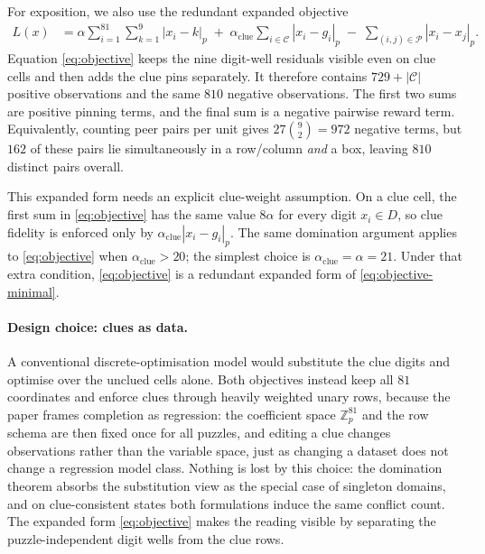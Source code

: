 \documentclass[11pt]{article}
\begin{document}
For exposition, we also use the redundant expanded objective
\begin{align}
L(x) &=
\alpha\sum_{i=1}^{81}\sum_{k=1}^9 |x_i - k|_p
\;+\;
\alpha_{\mathrm{clue}}\sum_{i\in\mathcal{C}} |x_i - g_i|_p
\;-\;
\sum_{(i,j)\in\mathcal{P}} |x_i-x_j|_p.
\label{eq:objective}
\end{align}
Equation \eqref{eq:objective} keeps the nine digit-well residuals visible even on clue cells and then adds the clue pins separately. It therefore contains \(729+|\mathcal C|\) positive observations and the same \(810\) negative observations. The first two sums are positive pinning terms, and the final sum is a negative pairwise reward term. Equivalently, counting peer pairs per unit gives $27\binom{9}{2}=972$ negative terms, but $162$ of these pairs lie simultaneously in a row/column \emph{and} a box, leaving $810$ distinct pairs overall.

This expanded form needs an explicit clue-weight assumption. On a clue cell, the first sum in \eqref{eq:objective} has the same value \(8\alpha\) for every digit \(x_i\in D\), so clue fidelity is enforced only by \(\alpha_{\mathrm{clue}}|x_i-g_i|_p\). The same domination argument applies to \eqref{eq:objective} when \(\alpha_{\mathrm{clue}}>20\); the simplest choice is \(\alpha_{\mathrm{clue}}=\alpha=21\). Under that extra condition, \eqref{eq:objective} is a redundant expanded form of \eqref{eq:objective-minimal}.

\paragraph{Design choice: clues as data.}
A conventional discrete-optimisation model would substitute the clue digits and optimise over the unclued cells alone. Both objectives instead keep all \(81\) coordinates and enforce clues through heavily weighted unary rows, because the paper frames completion as regression: the coefficient space \(\mathbb Z_p^{81}\) and the row schema are then fixed once for all puzzles, and editing a clue changes observations rather than the variable space, just as changing a dataset does not change a regression model class. Nothing is lost by this choice: the domination theorem absorbs the substitution view as the special case of singleton domains, and on clue-consistent states both formulations induce the same conflict count. The expanded form \eqref{eq:objective} makes the reading visible by separating the puzzle-independent digit wells from the clue rows.
\end{document}
